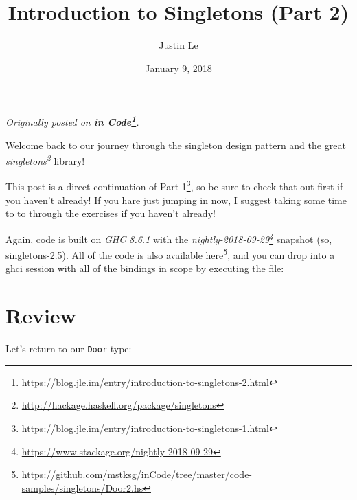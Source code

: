 \documentclass[]{article}
\title{Introduction to Singletons (Part 2)}
\author{Justin Le}
\date{January 9, 2018}
\newenvironment{Shaded}{}{}
\newcommand{\CommentTok}[1]{\textcolor[rgb]{0.38,0.63,0.69}{\textit{#1}}}
\newcommand{\DataTypeTok}[1]{\textcolor[rgb]{0.56,0.13,0.00}{#1}}
\newcommand{\ExtensionTok}[1]{#1}
\newcommand{\FunctionTok}[1]{\textcolor[rgb]{0.02,0.16,0.49}{#1}}
\newcommand{\KeywordTok}[1]{\textcolor[rgb]{0.00,0.44,0.13}{\textbf{#1}}}
\newcommand{\NormalTok}[1]{#1}
\newcommand{\OtherTok}[1]{\textcolor[rgb]{0.00,0.44,0.13}{#1}}
\renewcommand{\href}[2]{#2\footnote{\url{#1}}}
\begin{document}
\maketitle

\emph{Originally posted on
\textbf{\href{https://blog.jle.im/entry/introduction-to-singletons-2.html}{in
Code}}.}

Welcome back to our journey through the singleton design pattern and the great
\emph{\href{http://hackage.haskell.org/package/singletons}{singletons}} library!

This post is a direct continuation of
\href{https://blog.jle.im/entry/introduction-to-singletons-1.html}{Part 1}, so
be sure to check that out first if you haven't already! If you hare just jumping
in now, I suggest taking some time to to through the exercises if you haven't
already!

Again, code is built on \emph{GHC 8.6.1} with the
\emph{\href{https://www.stackage.org/nightly-2018-09-29}{nightly-2018-09-29}}
snapshot (so, singletons-2.5). All of the code is also available
\href{https://github.com/mstksg/inCode/tree/master/code-samples/singletons/Door2.hs}{here},
and you can drop into a ghci session with all of the bindings in scope by
executing the file:

\begin{Shaded}
\end{Shaded}

\hypertarget{review}{%
\section{Review}\label{review}}

Let's return to our \texttt{Door} type:

\begin{Shaded}
\end{Shaded}
\end{document}
